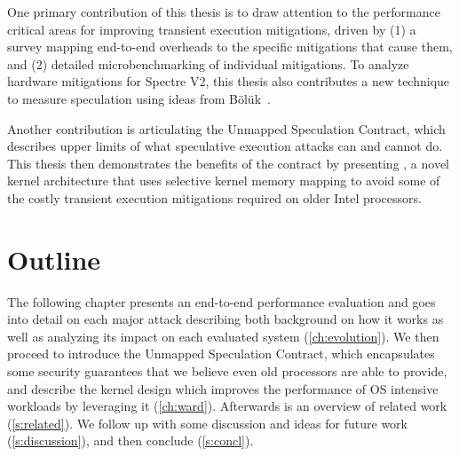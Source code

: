 One primary contribution of this thesis is to draw attention to the performance critical areas for improving transient execution mitigations, driven by 
(1) a survey mapping end-to-end overheads to the specific mitigations that cause them, and 
(2) detailed microbenchmarking of individual mitigations.
To analyze hardware mitigations for Spectre V2, this thesis also contributes a new technique to measure speculation using ideas from Bölük~\cite{speculating-x86}.

Another contribution is articulating the Unmapped Speculation Contract, which describes upper limits of what speculative execution attacks can and cannot do.
This thesis then demonstrates the benefits of the contract
by presenting \sys{}, a novel kernel architecture that uses
selective kernel memory mapping to avoid some of the costly transient execution
mitigations required on older Intel processors.

\section{Outline}
The following chapter presents an end-to-end performance evaluation and goes into detail on each major attack describing both background on how it works as well as analyzing its impact on each evaluated system (\autoref{ch:evolution}).
We then proceed to introduce the Unmapped Speculation Contract, which encapsulates some security guarantees that we believe even old processors are able to provide, and describe the \sys kernel design which improves the performance of OS intensive workloads by leveraging it (\autoref{ch:ward}).
Afterwards is an overview of related work (\autoref{s:related}).
We follow up with some discussion and ideas for future work (\autoref{s:discussion}), and then conclude (\autoref{s:concl}).
